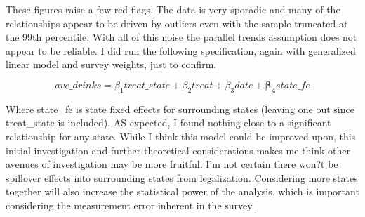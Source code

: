 \documentclass[11pt]{article}
\begin{document}
\begin{figure}
	\hspace{0mm}

\end{figure}


These figures raise a few red flags. The data is very sporadic and many of the relationships appear to be driven by outliers even with the sample truncated at the 99th percentile. With all of this noise the parallel trends assumption does not appear to be reliable. I did run the following specification, again with generalized linear model and survey weights, just to confirm. 

$$
ave\_drinks =  \beta_1 treat\_state + \beta_2treat + \beta_3date + \bm{\beta_4}state\_fe
$$

Where state\_fe is state fixed effects for surrounding states (leaving one out since treat\_state is included). AS expected, I found nothing close to a significant relationship for any state. While I think this model could be improved upon, this initial investigation and further theoretical considerations makes me think other avenues of investigation may be more fruitful. I'm not certain there won?t be spillover effects into surrounding states from legalization. Considering more states together will also increase the statistical power of the analysis, which is important considering the measurement error inherent in the survey.     
\end{document}
